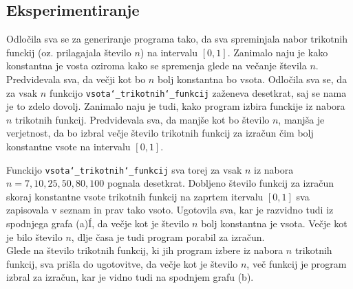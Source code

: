 \documentclass[11pt]{article}
\theoremstyle{definition}
\newcommand{\1}{\mathbbm{1}}
\begin{document}
\subsection{Eksperimentiranje}
\vspace{0.5cm}

Odločila sva se za generiranje programa tako, da sva spreminjala nabor trikotnih funckij (oz. prilagajala število $n$) na intervalu $[0,1]$. Zanimalo naju je kako konstantna je vosta oziroma kako se spremenja glede na večanje števila $n$. Predvidevala sva, da večji kot bo $n$ bolj konstantna bo vsota. Odločila sva se, da za vsak $n$ funkcijo \texttt{vsota\char`_trikotnih\char`_funkcij} zaženeva desetkrat, saj se nama je to zdelo dovolj. 
Zanimalo naju je tudi, kako program izbira funckije iz nabora $n$ trikotnih funkcij. Predvidevala sva, da manjše kot bo število $n$, manjša je verjetnost, da bo izbral večje število trikotnih funkcij za izračun čim bolj konstantne vsote na intervalu $[0,1]$. \\
\vspace{0.25cm}

Funckijo \texttt{vsota\char`_trikotnih\char`_funkcij} sva torej za vsak $n$ iz nabora $n = {7, 10, 25, 50, 80, 100}$ pognala desetkrat. Dobljeno število funkcij za izračun skoraj konstantne vsote trikotnih funkcij na zaprtem itervalu $[0,1]$ sva zapisovala v seznam in prav tako vsoto. 
Ugotovila sva, kar je razvidno tudi iz spodnjega grafa (a)Í, da večje kot je število $n$ bolj konstantna je vsota. Večje kot je bilo število $n$, dlje časa je tudi program porabil za izračun. \\

Glede na število trikotnih funkcij, ki jih program izbere iz nabora $n$ trikotnih funkcij, sva prišla do ugotovitve, da večje kot je število $n$, več funkcij je program izbral za izračun, kar je vidno tudi na spodnjem grafu (b). \\	
\end{document}
